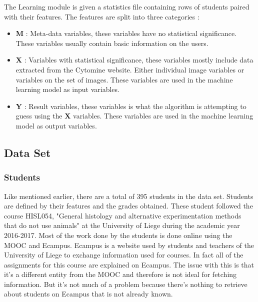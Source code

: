 \documentclass[a4paper,11pt]{report}
\numberwithin{figure}{section} %
\begin{document}
    The Learning module is given a statistics file containing rows of students paired with their features. The features are split into three categories :
    \begin{itemize}
\item[\textbullet] \textbf{M} : Meta-data variables, these variables have no statistical significance. These variables usually contain basic information on the users.\\
\item[\textbullet] \textbf{X} : Variables with statistical significance, these variables mostly include data extracted from the Cytomine website. Either individual image variables or variables on the set of images. These variables are used in the machine learning model as input variables.\\
\item[\textbullet] \textbf{Y} : Result variables, these variables is what the algorithm is attempting to guess using the  \textbf{X} variables. These variables are used in the machine learning model as output variables.\\ 
\end{itemize}
    
    
    
    \subsection{Data Set}
    
    	\subsubsection{Students}
    Like mentioned earlier, there are a total of 395 students in the data set. Students are defined by their features and the grades obtained. These student followed the course HISL054, "General histology and alternative experimentation methods that do not use animals" at the University of Liege during the academic year 2016-2017. Most of the work done by the students is done online using the MOOC and Ecampus. Ecampus is a website used by students and teachers of the University of Liege to exchange information used for courses. In fact all of the assignments for this course are explained on Ecampus. The issue with this is that it's a different entity from the MOOC and therefore is not ideal for fetching information. But it's not much of a problem because there's nothing to retrieve about students on Ecampus that is not already known.\newline
    
\end{document}
